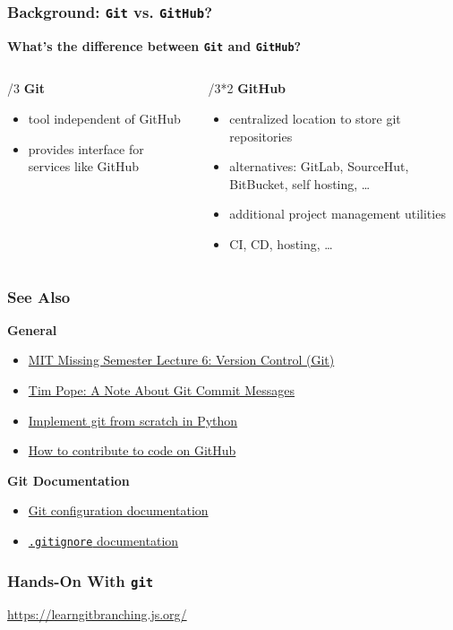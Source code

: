\documentclass{beamer} \usetheme{Madrid}
\begin{document}
\begin{frame} \frametitle{Background: \texttt{Git} vs. \texttt{GitHub}?}
	\centering \textbf{What's the difference between \texttt{Git} and \texttt{GitHub}?}
	\vfill
	\begin{columns}[t]
		\begin{column}{{\textwidth}/3}
			\centering \textbf{Git}
			\begin{itemize}
				\item tool independent of GitHub
				\item provides interface for services like GitHub
			\end{itemize}
		\end{column}
		\begin{column}{{\textwidth}/3*2}
			\centering \textbf{GitHub}
			\begin{itemize}
				\item centralized location to store git repositories
				\item alternatives: GitLab, SourceHut, BitBucket, self hosting, \ldots
				\item additional project management utilities
				\item CI, CD, hosting, \ldots
			\end{itemize}
		\end{column}
	\end{columns}
\end{frame}

\begin{frame}
	\frametitle{See Also}
	\centering \textbf{General}
	\begin{itemize}
		\setlength\itemsep{1em}
		\item \href{https://missing.csail.mit.edu/2020/version-control/}{MIT Missing Semester Lecture 6: Version Control (Git)}
		\item \href{https://tbaggery.com/2008/04/19/a-note-about-git-commit-messages.html}{Tim Pope: A Note About Git Commit Messages}
		\item \href{https://wyag.thb.lt/}{Implement git from scratch in Python}
		\item
		      \href{https://docs.github.com/en/free-pro-team@latest/github/collaborating-with-issues-and-pull-requests/about-pull-requests}{How to contribute to code on GitHub}
	\end{itemize}
	\vfill
	\centering \textbf{Git Documentation}
	\begin{itemize}
		\item \href{https://git-scm.com/docs/git-config}{Git configuration documentation}
		\item \href{https://git-scm.com/docs/gitignore}{\texttt{.gitignore} documentation}
	\end{itemize}
\end{frame}

\begin{frame}
	\frametitle{Hands-On With \texttt{git}}
	\centering
	\large{\url{https://learngitbranching.js.org/}}
\end{frame}
\end{document}
